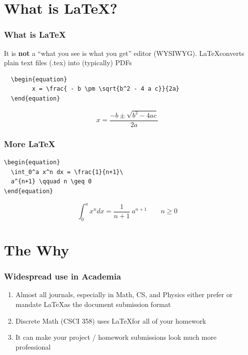 \documentclass{beamer}
\begin{document}
\section{What is \LaTeX?}

\begin{frame}[fragile]
  \frametitle{What is \LaTeX}

  It is \textbf{not} a ``what you see is what you get'' editor (WYSIWYG). \LaTeX converts plain text files (.tex) into (typically) PDFs

\begin{verbatim}
  \begin{equation}
        x = \frac{ - b \pm \sqrt{b^2 - 4 a c}}{2a}
  \end{equation}
\end{verbatim}
\par
  \hrulefill\par
  \begin{equation}
        x = \frac{ - b \pm \sqrt{b^2 - 4 a c}}{2a}
  \end{equation}

\end{frame}

\begin{frame}[fragile]
\frametitle{More \LaTeX}
\begin{verbatim}
\begin{equation}
  \int_0^a x^n dx = \frac{1}{n+1}\
  a^{n+1} \qquad n \geq 0
\end{equation}
\end{verbatim}\par
  \hrulefill\par

\begin{equation}
  \int_0^a x^n dx = \frac{1}{n+1}\
  a^{n+1} \qquad n \geq 0
\end{equation}

\end{frame}

\section{The Why}


\begin{frame}[fragile]
  \frametitle{Widespread use in Academia}

  \begin{enumerate}
    \item {Almost all journals, especially in Math, CS, and Physics
      either prefer or mandate \LaTeX as the document submission
      format}
    \item {Discrete Math (CSCI 358) uses \LaTeX for all of your homework}
    \item {It can make your project / homework submissions look much more professional}
   \end{enumerate}

\vskip 1cm

\end{frame}
\end{document}
